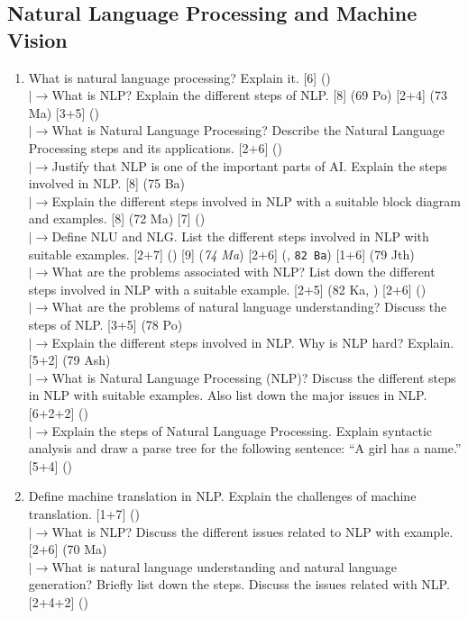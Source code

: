 \documentclass[12pt]{article}
\newcommand{\lb}{\\$\left|\rightarrow\right.$}
\begin{document}
  \subsection{Natural Language Processing and Machine Vision}
    \begin{enumerate}[topsep=0pt, noitemsep]
      \item What is natural language processing? Explain it. \hfill [6] ()
        \lb What is NLP? Explain the different steps of NLP. \hfill [8] (69 Po) [2+4] (73 Ma) [3+5] ()
        \lb What is Natural Language Processing? Describe the Natural Language Processing steps and its applications. \hfill [2+6] ()
        \lb Justify that NLP is one of the important parts of AI. Explain the steps involved in NLP. \hfill [8] (75 Ba)
        \lb Explain the different steps involved in NLP with a suitable block diagram and examples. \hfill [8] (72 Ma) [7] ()
        \lb Define NLU and NLG. List the different steps involved in NLP with suitable examples. \hfill [2+7] () [9] (\textit{74 Ma}) [2+6] (, \texttt{82 Ba}) [1+6] (79 Jth)
        \lb What are the problems associated with NLP? List down the different steps involved in NLP with a suitable example. \hfill [2+5] (82 Ka, ) [2+6] ()
        \lb What are the problems of natural language understanding? Discuss the steps of NLP. \hfill [3+5] (78 Po)
        \lb Explain the different steps involved in NLP. Why is NLP hard? Explain. \hfill [5+2] (79 Ash)
        \lb What is Natural Language Processing (NLP)? Discuss the different steps in NLP with suitable examples. Also list down the major issues in NLP. \hfill [6+2+2] ()
        \lb Explain the steps of Natural Language Processing. Explain syntactic analysis and draw a parse tree for the following sentence: ``A girl has a name.'' \hfill [5+4] ()

      \item Define machine translation in NLP. Explain the challenges of machine translation. \hfill [1+7] ()
        \lb What is NLP? Discuss the different issues related to NLP with example. \hfill [2+6] (70 Ma)
        \lb What is natural language understanding and natural language generation? Briefly list down the steps. Discuss the issues related with NLP. \hfill [2+4+2] ()


\end{enumerate}
\end{document}
